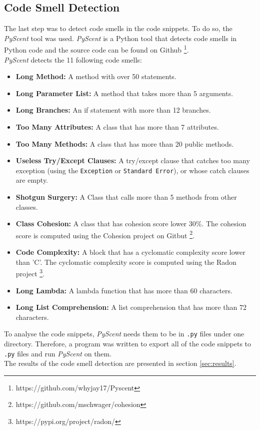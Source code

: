\subsection{Code Smell Detection}
The last step was to detect code smells in the code snippets. To do so, the \textit{PyScent} tool was used. \textit{PyScent} is a Python tool that detects code smells in Python code and the source code can be found on Github \footnote{https://github.com/whyjay17/Pyscent}. \\

\textit{PyScent} detects the 11 following code smells:

\begin{itemize}
    \item \textbf{Long Method:} A method with over 50 statements.

    \item \textbf{Long Parameter List:} A method that takes more than 5 arguments.

    \item \textbf{Long Branches: } An if statement with more than 12 branches.

    \item \textbf{Too Many Attributes:} A class that has more than 7 attributes.

    \item \textbf{Too Many Methods:} A class that has more than 20 public methods.

    \item \textbf{Useless Try/Except Clauses: } A try/except clause that catches too many exception (using the \texttt{Exception} or \texttt{Standard Error}), or whose catch clauses are empty.

    \item \textbf{Shotgun Surgery: } A Class that calls more than 5 methods from other classes.

    \item \textbf{Class Cohesion: } A class that has cohesion score lower 30\%. The cohesion score is computed using the Cohesion project on Gitbut \footnote{https://github.com/mschwager/cohesion}.

    \item \textbf{Code Complexity: } A block that has a cyclomatic complexity score lower than 'C'. The cyclomatic complexity score is computed using the Radon project \footnote{https://pypi.org/project/radon/}.

    \item \textbf{Long Lambda: } A lambda function that has more than 60 characters.

    \item \textbf{Long List Comprehension: } A list comprehension that has more than 72 characters.

\end{itemize}

To analyse the code snippets, \textit{PyScent} needs them to be in \texttt{.py} files under one directory. Therefore, a program was written to export all of the code snippets to \texttt{.py} files and run \textit{PyScent} on them. \\

The results of the code smell detection are presented in section \ref{sec:results}.